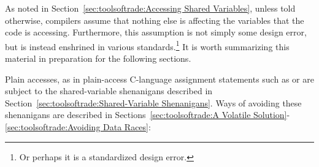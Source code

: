 As noted in Section~\ref{sec:toolsoftrade:Accessing Shared Variables},
unless told otherwise, compilers assume that nothing else
is affecting the variables that the code is accessing.
Furthermore, this assumption is not simply some design error, but is
instead enshrined in various standards.\footnote{
	Or perhaps it is a standardized design error.}
It is worth summarizing this material in preparation for the following
sections.

Plain accesses, as in plain-access C-language assignment statements such
as  or  are subject to the
shared-variable shenanigans described in
Section~\ref{sec:toolsoftrade:Shared-Variable Shenanigans}.
Ways of avoiding these shenanigans are described in
Sections~\ref{sec:toolsoftrade:A Volatile Solution}-\ref{sec:toolsoftrade:Avoiding Data Races}:
\fi

